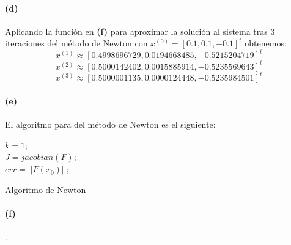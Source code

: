 \paragraph{(d)}
Aplicando la funci\'on en \textbf{(f)} para aproximar la soluci\'on al sistema tras 3 iteraciones del m\'etodo de Newton con $x^{(0)}=[0.1,0.1,-0.1]^t$ obtenemos:
$$x^{(1)}\approx[0.4998696729,0.0194668485,-0.5215204719]^t$$
$$x^{(2)}\approx[0.5000142402,0.0015885914,-0.5235569643]^t$$
$$x^{(3)}\approx[0.5000001135,0.0000124448,-0.5235984501]^t$$
\paragraph{(e)}
El algoritmo para del m\'etodo de Newton es el siguiente:
\begin{algorithm}
	$k=1$;\\
	$J=jacobian(F)$;\\
	$err=||F(x_0)||$;\\
	\caption{Algoritmo de Newton}
\end{algorithm}
\paragraph{(f)}.

